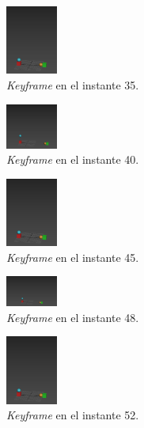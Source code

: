 \documentclass{article}
\begin{document}
\begin{figure}[H]
    \centering
    \includegraphics[width=0.15\textwidth]{imagenes/p1_ins15.png}
    \caption{\textit{Keyframe} en el instante 35.}
\end{figure}

\begin{figure}[H]
    \centering
    \includegraphics[width=0.15\textwidth]{imagenes/p1_ins40.png}
    \caption{\textit{Keyframe} en el instante 40.}
\end{figure}

\begin{figure}[H]
    \centering
    \includegraphics[width=0.15\textwidth]{imagenes/p1_ins15.png}
    \caption{\textit{Keyframe} en el instante 45.}
\end{figure}

\begin{figure}[H]
    \centering
    \includegraphics[width=0.15\textwidth]{imagenes/p1_ins48.png}
    \caption{\textit{Keyframe} en el instante 48.}
\end{figure}

\begin{figure}[H]
    \centering
    \includegraphics[width=0.15\textwidth]{imagenes/p1_ins15.png}
    \caption{\textit{Keyframe} en el instante 52.}
\end{figure}
\end{document}
